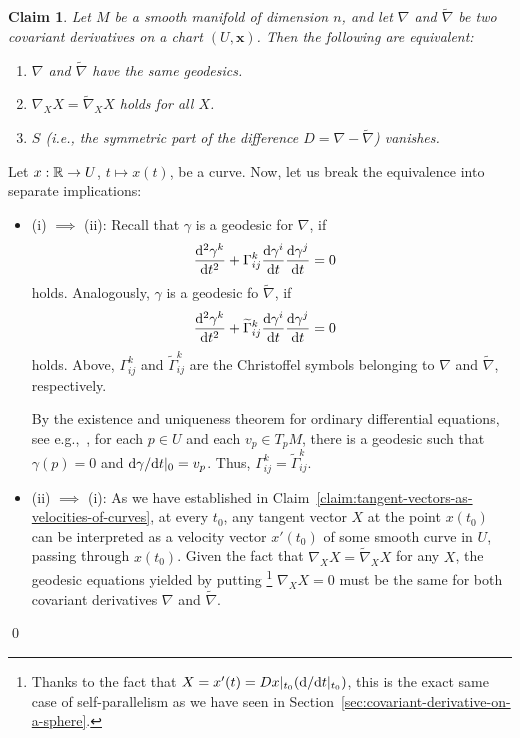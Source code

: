 \documentclass[11pt,a4paper,twoside,openany]{report}
\theoremstyle{my-theorem}
\newtheorem{claim}[theorem]{Claim}
\theoremstyle{non-theorem}
\renewenvironment{proof}[1][\proofname]{{\scshape #1. }}{\qed}
\begin{document}
			\begin{claim}
				Let $M$ be a smooth manifold of dimension $n$, and let $\nabla$ and $\tilde\nabla$ be two covariant derivatives on a chart $(U,\mathbf x)$. Then the following are equivalent:
				\begin{enumerate}[label=\rm(\roman*)]
					\item $\nabla$ and $\tilde\nabla$ have the same geodesics.
					\item $\nabla_XX = \tilde\nabla_XX$ holds for all $X$.
					\item $S$ (i.e., the symmetric part of the difference $D = \nabla - \tilde\nabla$) vanishes.
				\end{enumerate}
			\end{claim}
		
			\begin{proof}
				Let $x: {\mathbb R} \to U$, $t \mapsto x(t)$, be a curve. Now, let us break the equivalence into separate implications:
				\begin{itemize}
					\item (i) $\implies$ (ii): Recall that $\gamma$ is a geodesic for $\nabla$, if
					\begin{align*}
						\frac{{\mathrm d}^2 \gamma^k}{{\mathrm d} t^2} + \Gamma^k_{ij} \frac{{\mathrm d}\gamma^i}{{\mathrm d} t} \frac{{\mathrm d}\gamma^j}{{\mathrm d} t} &= 0
					\end{align*}
					holds. Analogously, $\gamma$ is a geodesic fo $\tilde\nabla$, if
					\begin{align*}
						\frac{{\mathrm d}^2 \gamma^k}{{\mathrm d} t^2} + \widetilde\Gamma^k_{ij} \frac{{\mathrm d}\gamma^i}{{\mathrm d} t} \frac{{\mathrm d}\gamma^j}{{\mathrm d} t} &= 0
					\end{align*}
					holds. Above, $\Gamma^k_{ij}$ and $\tilde\Gamma^k_{ij}$ are the Christoffel symbols belonging to $\nabla$ and $\tilde\nabla$, respectively.
					
					By the existence and uniqueness theorem for ordinary differential equations, see e.g.,~\cite{hartman:orginary-differential-equations}, for each $p \in U$ and each $v_p \in T_pM$, there is a geodesic such that $\gamma(p)=0$ and ${\mathrm d}\gamma/{\mathrm d} t |_0 = v_p$. Thus, $\Gamma^k_{ij} = \tilde\Gamma^k_{ij}$.
					
					\item (ii) $\implies$ (i): As we have established in Claim~\ref{claim:tangent-vectors-as-velocities-of-curves}, at every $t_0$, any tangent vector $X$ at the point $x(t_0)$ can be interpreted as a velocity vector $x'(t_0)$ of some smooth curve in $U$, passing through $x(t_0)$. Given the fact that $\nabla_XX = \tilde\nabla_XX$ for any $X$, the geodesic equations yielded by putting%
						\footnote{Thanks to the fact that $X = x'(t) = Dx|_{t_0}({\mathrm d}/{\mathrm d} t|_{t_0})$, this is the exact same case of self-parallelism as we have seen in Section~\ref{sec:covariant-derivative-on-a-sphere}.}
					$\nabla_XX=0$ must be the same for both covariant derivatives $\nabla$ and $\tilde\nabla$.
					

\end{itemize}
\end{proof}
\end{document}
